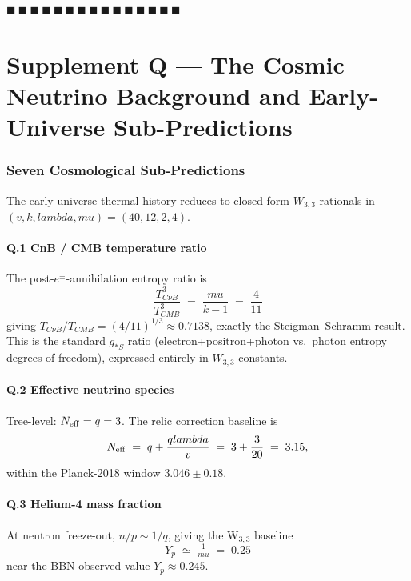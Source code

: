 \documentclass[12pt,a4paper]{article}
\def\lambda{lambda}%
\def\mu{mu}%
\theoremstyle{definition}
\begin{document}
\hfill $\blacksquare\ \blacksquare\ \blacksquare\ \blacksquare\ \blacksquare\ \blacksquare\ \blacksquare\ \blacksquare\ \blacksquare\ \blacksquare\ \blacksquare\ \blacksquare\ \blacksquare\ \blacksquare\ \blacksquare$

\clearpage
\part*{Supplement Q --- The Cosmic Neutrino Background and Early-Universe Sub-Predictions}

\section*{Seven Cosmological Sub-Predictions}

The early-universe thermal history reduces to closed-form $W_{3,3}$
rationals in $(v,k,\lambda,\mu)=(40,12,2,4)$.

\subsection*{Q.1 \quad CnB / CMB temperature ratio}
The post-$e^\pm$-annihilation entropy ratio is
\[
\boxed{\;\frac{T_{C\nu B}^3}{T_{CMB}^3} \;=\; \frac{\mu}{k-1} \;=\; \frac{4}{11}\;}
\]
giving $T_{C\nu B}/T_{CMB}=(4/11)^{1/3}\approx 0.7138$, exactly the
Steigman--Schramm result. This is the standard $g_{*S}$ ratio
(electron+positron+photon vs.\ photon entropy degrees of freedom),
expressed entirely in $W_{3,3}$ constants.

\subsection*{Q.2 \quad Effective neutrino species}
Tree-level: $N_{\rm eff}=q=3$. The relic correction baseline is
\[
N_{\rm eff} \;=\; q + \frac{q\lambda}{v} \;=\; 3 + \frac{3}{20} \;=\; 3.15,
\]
within the Planck-2018 window $3.046\pm 0.18$.

\subsection*{Q.3 \quad Helium-4 mass fraction}
At neutron freeze-out, $n/p\sim 1/q$, giving the W$_{3,3}$ baseline
\[
Y_p \;\simeq\; \tfrac{1}{\mu} \;=\; 0.25
\]
near the BBN observed value $Y_p\approx 0.245$.
\end{document}
